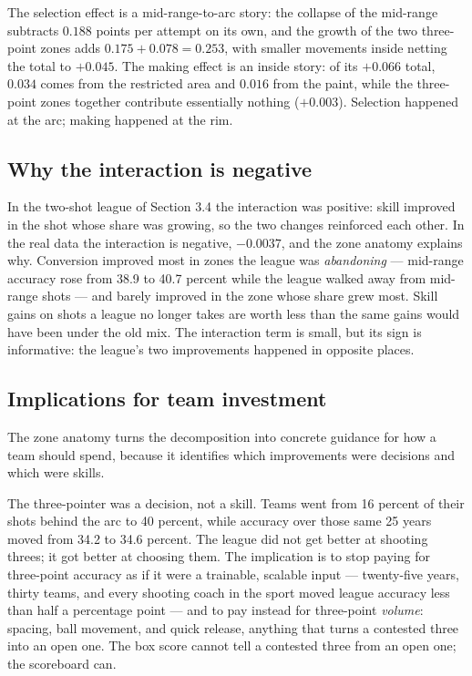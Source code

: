 \documentclass[12pt]{article}
\begin{document}
The selection effect is a mid-range-to-arc story: the collapse of the
mid-range subtracts $0.188$ points per attempt on its own, and the growth of
the two three-point zones adds $0.175 + 0.078 = 0.253$, with smaller
movements inside netting the total to $+0.045$. The making effect is an
inside story: of its $+0.066$ total, $0.034$ comes from the restricted area
and $0.016$ from the paint, while the three-point zones together contribute
essentially nothing ($+0.003$). Selection happened at the arc; making
happened at the rim.

\subsection{Why the interaction is negative}

In the two-shot league of Section 3.4 the interaction was positive: skill
improved in the shot whose share was growing, so the two changes reinforced
each other. In the real data the interaction is negative, $-0.0037$, and the
zone anatomy explains why. Conversion improved most in zones the league was
\emph{abandoning} --- mid-range accuracy rose from 38.9 to 40.7 percent while
the league walked away from mid-range shots --- and barely improved in the
zone whose share grew most. Skill gains on shots a league no longer takes are
worth less than the same gains would have been under the old mix. The
interaction term is small, but its sign is informative: the league's two
improvements happened in opposite places.

\subsection{Implications for team investment}

The zone anatomy turns the decomposition into concrete guidance for how a
team should spend, because it identifies which improvements were decisions
and which were skills.

The three-pointer was a decision, not a skill. Teams went from 16 percent of
their shots behind the arc to 40 percent, while accuracy over those same 25
years moved from 34.2 to 34.6 percent. The league did not get better at
shooting threes; it got better at choosing them. The implication is to stop
paying for three-point accuracy as if it were a trainable, scalable input ---
twenty-five years, thirty teams, and every shooting coach in the sport moved
league accuracy less than half a percentage point --- and to pay instead for
three-point \emph{volume}: spacing, ball movement, and quick release,
anything that turns a contested three into an open one. The box score cannot
tell a contested three from an open one; the scoreboard can.
\end{document}
